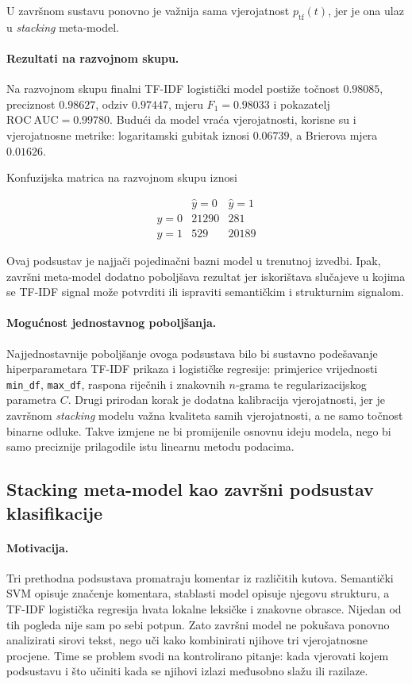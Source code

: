 \documentclass{article}
\begin{document}
U završnom sustavu ponovno je važnija sama vjerojatnost $p_{\mathrm{tf}}(t)$, jer je ona ulaz u \textit{stacking} meta-model.

\paragraph{Rezultati na razvojnom skupu.}
Na razvojnom skupu finalni TF-IDF logistički model postiže točnost $0.98085$, preciznost $0.98627$, odziv $0.97447$, mjeru $F_1=0.98033$ i pokazatelj $\mathrm{ROC\ AUC}=0.99780$. Budući da model vraća vjerojatnosti, korisne su i vjerojatnosne metrike: logaritamski gubitak iznosi $0.06739$, a Brierova mjera $0.01626$.

Konfuzijska matrica na razvojnom skupu iznosi

\[
\begin{array}{c|cc}
 & \hat y=0 & \hat y=1 \\
\hline
y=0 & 21290 & 281 \\
y=1 & 529 & 20189
\end{array}
\]

Ovaj podsustav je najjači pojedinačni bazni model u trenutnoj izvedbi. Ipak, završni meta-model dodatno poboljšava rezultat jer iskorištava slučajeve u kojima se TF-IDF signal može potvrditi ili ispraviti semantičkim i strukturnim signalom.

\paragraph{Mogućnost jednostavnog poboljšanja.}
Najjednostavnije poboljšanje ovoga podsustava bilo bi sustavno podešavanje hiperparametara TF-IDF prikaza i logističke regresije: primjerice vrijednosti \texttt{min\_df}, \texttt{max\_df}, raspona riječnih i znakovnih $n$-grama te regularizacijskog parametra $C$. Drugi prirodan korak je dodatna kalibracija vjerojatnosti, jer je završnom \textit{stacking} modelu važna kvaliteta samih vjerojatnosti, a ne samo točnost binarne odluke. Takve izmjene ne bi promijenile osnovnu ideju modela, nego bi samo preciznije prilagodile istu linearnu metodu podacima.

\subsection{Stacking meta-model kao završni podsustav klasifikacije}

\paragraph{Motivacija.}
Tri prethodna podsustava promatraju komentar iz različitih kutova. Semantički SVM opisuje značenje komentara, stablasti model opisuje njegovu strukturu, a TF-IDF logistička regresija hvata lokalne leksičke i znakovne obrasce. Nijedan od tih pogleda nije sam po sebi potpun. Zato završni model ne pokušava ponovno analizirati sirovi tekst, nego uči kako kombinirati njihove tri vjerojatnosne procjene. Time se problem svodi na kontrolirano pitanje: kada vjerovati kojem podsustavu i što učiniti kada se njihovi izlazi međusobno slažu ili razilaze.
\end{document}
